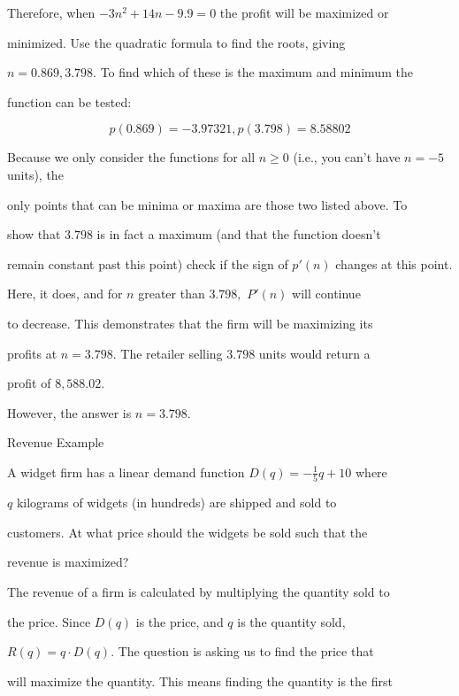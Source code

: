 Therefore, when $-3n^{2}+14n-9.9=0$ the profit will be maximized or

minimized. Use the quadratic formula to find the roots, giving

$n=0.869,3.798.$ To find which of these is the maximum and minimum the

function can be tested:



$$p(0.869)=-3.97321,p(3.798)=8.58802$$



Because we only consider the functions for all $n\ge 0$ (i.e., you can't have $n=-5$ units), the

only points that can be minima or maxima are those two listed above. To

show that $3.798$ is in fact a maximum (and that the function doesn't

remain constant past this point) check if the sign of $p'(n)$ changes at this point.



Here, it does, and for $n$ greater than $3.798,$ $P'(n)$ will continue

to decrease. This demonstrates that the firm will be maximizing its

profits at $n=3.798.$ The retailer selling $3.798$ units would return a

profit of $8,588.02.$



However, the answer is $n=3.798.$



Revenue Example



A widget firm has a linear demand function $D(q)=-\frac{1}{5}q+10$ where

$q$ kilograms of widgets (in hundreds) are shipped and sold to

customers. At what price should the widgets be sold such that the

revenue is maximized?



The revenue of a firm is calculated by multiplying the quantity sold to

the price. Since $D(q)$ is the price, and $q$ is the quantity sold,

$R(q)=q\cdot D(q).$ The question is asking us to find the price that

will maximize the quantity. This means finding the quantity is the first

